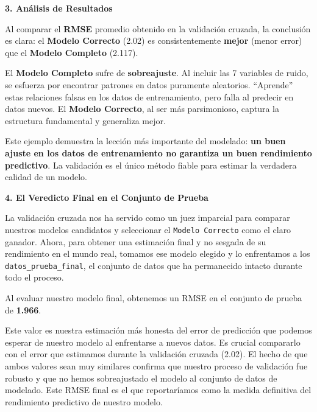 \documentclass[
  letterpaper,
  DIV=11,
  numbers=noendperiod]{scrreprt}
\newenvironment{Shaded}{\begin{snugshade}}{\end{snugshade}}
\newcommand{\AttributeTok}[1]{\textcolor[rgb]{0.40,0.45,0.13}{#1}}
\newcommand{\CommentTok}[1]{\textcolor[rgb]{0.37,0.37,0.37}{#1}}
\newcommand{\FunctionTok}[1]{\textcolor[rgb]{0.28,0.35,0.67}{#1}}
\newcommand{\NormalTok}[1]{\textcolor[rgb]{0.00,0.23,0.31}{#1}}
\newcommand{\OtherTok}[1]{\textcolor[rgb]{0.00,0.23,0.31}{#1}}
\newcommand{\SpecialCharTok}[1]{\textcolor[rgb]{0.37,0.37,0.37}{#1}}
\begin{document}
\begin{tcolorbox}
\textbf{3. Análisis de Resultados}

Al comparar el \textbf{RMSE} promedio obtenido en la validación cruzada,
la conclusión es clara: el \textbf{Modelo Correcto} (2.02) es
consistentemente \textbf{mejor} (menor error) que el \textbf{Modelo
Completo} (2.117).

El \textbf{Modelo Completo} sufre de \textbf{sobreajuste}. Al incluir
las 7 variables de ruido, se esfuerza por encontrar patrones en datos
puramente aleatorios. ``Aprende'' estas relaciones falsas en los datos
de entrenamiento, pero falla al predecir en datos nuevos. El
\textbf{Modelo Correcto}, al ser más parsimonioso, captura la estructura
fundamental y generaliza mejor.

Este ejemplo demuestra la lección más importante del modelado:
\textbf{un buen ajuste en los datos de entrenamiento no garantiza un
buen rendimiento predictivo}. La validación es el único método fiable
para estimar la verdadera calidad de un modelo.

\textbf{4. El Veredicto Final en el Conjunto de Prueba}

La validación cruzada nos ha servido como un juez imparcial para
comparar nuestros modelos candidatos y seleccionar el
\texttt{Modelo\ Correcto} como el claro ganador. Ahora, para obtener una
estimación final y no sesgada de su rendimiento en el mundo real,
tomamos ese modelo elegido y lo enfrentamos a los
\texttt{datos\_prueba\_final}, el conjunto de datos que ha permanecido
intacto durante todo el proceso.

\begin{Shaded}
\end{Shaded}

Al evaluar nuestro modelo final, obtenemos un RMSE en el conjunto de
prueba de \textbf{1.966}.

Este valor es nuestra estimación más honesta del error de predicción que
podemos esperar de nuestro modelo al enfrentarse a nuevos datos. Es
crucial compararlo con el error que estimamos durante la validación
cruzada (2.02). El hecho de que ambos valores sean muy similares
confirma que nuestro proceso de validación fue robusto y que no hemos
sobreajustado el modelo al conjunto de datos de modelado. Este RMSE
final es el que reportaríamos como la medida definitiva del rendimiento
predictivo de nuestro modelo.

\end{tcolorbox}
\end{document}
